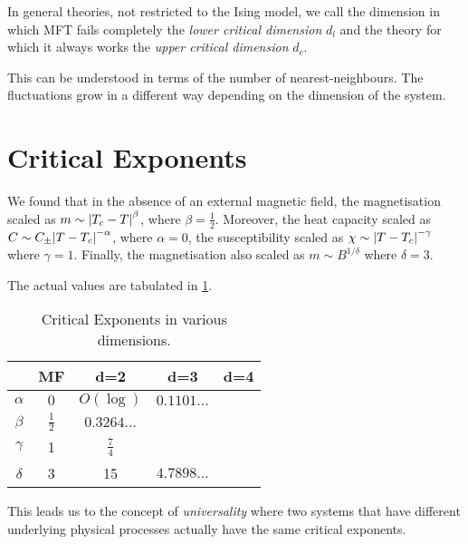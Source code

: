 In general theories, not restricted to the Ising model, we call the dimension in which MFT fails completely the \emph{lower critical dimension} $d_l$ and the theory for which it always works the \emph{upper critical dimension} $d_c$.

\begin{leftbar}
  \begin{remark}
    This can be understood in terms of the number of nearest-neighbours. The fluctuations grow in a different way depending on the dimension of the system.
  \end{remark}
\end{leftbar}

\section{Critical Exponents}%
\label{sec:critical_exponents}

We found that in the absence of an external magnetic field, the magnetisation scaled as $m \sim \abs{T_c - T}^{\beta}$, where $\beta = \frac{1}{2}$.
Moreover, the heat capacity scaled as $C \sim C_{\pm} \abs{T- T_c}^{-\alpha}$, where $\alpha = 0$, the susceptibility scaled as $\chi \sim \abs{T - T_c}^{-\gamma}$ where $\gamma = 1$. Finally, the magnetisation also scaled as $m \sim B^{1/\delta}$ where $\delta = 3$.

The actual values are tabulated in \ref{tab:criticalexp}.

\begin{table}[htpb]
  \centering
  \begin{tabular}{|c|c|c|c|c|}
    \hline
     & MF & d=2 & d=3 & d=4 \\
     \hline
    $\alpha$ & $0$ & $O(\log)$ & $0.1101\ldots$ & \\
    $\beta$ & $\frac{1}{2}$ & $0.3264\ldots$ & & \\
    $\gamma$ & 1 & $\frac{7}{4}$ & &  \\
    $\delta$ & 3 & 15 & $4.7898\ldots$ & \\
    \hline
  \end{tabular}
  \caption{Critical Exponents in various dimensions.}
  \label{tab:criticalexp}
\end{table}

This leads us to the concept of \emph{universality} where two systems that have different underlying physical processes actually have the same critical exponents.
